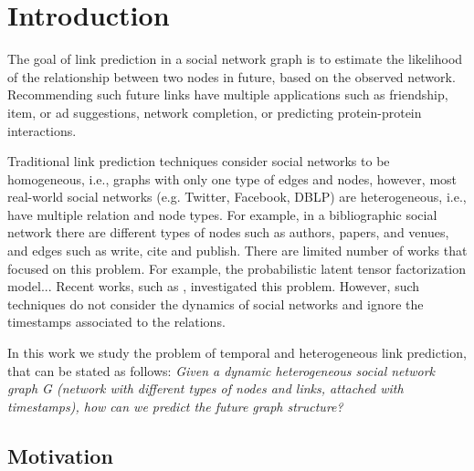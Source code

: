 \section{Introduction}
\label{Sec:Introduction}


The goal of link prediction in a social network graph \cite{liben2007link} is to estimate the likelihood of the relationship between two nodes in future, based on the observed network. Recommending such future links have multiple applications such as friendship, item, or ad suggestions, network completion, or predicting protein-protein interactions.


Traditional link prediction techniques  consider social networks to be homogeneous, i.e., graphs with only one type of edges and nodes, however, most real-world social networks (e.g. Twitter, Facebook, DBLP) are heterogeneous, i.e., have multiple relation and node types. For example, in a bibliographic social network there are different types of nodes such as authors, papers, and venues, and edges such as write, cite and publish. There are limited number of works that focused on this problem. For example, the probabilistic latent tensor factorization model... Recent works, such as \cite{sun2011pathsim}, investigated this problem. However, such techniques do not consider the dynamics of social networks and ignore the timestamps associated to the relations. 


In this work we study the problem of temporal and heterogeneous link prediction, that can be stated as follows: \textit{Given a dynamic heterogeneous social network graph G (network with different types of nodes and links, attached with timestamps), how can we predict the future graph structure?}





\subsection{Motivation}


